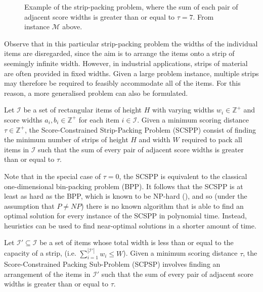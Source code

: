 \documentclass[oribibl]{llncs}
\begin{document}
\begin{figure}	
	\centering
	\begin{subfigure}[h]{0.44\textwidth}
		
		\label{fig:items} \vspace{5pt}
	\end{subfigure} 
	\begin{subfigure}[h]{0.7\textwidth}
		
		\label{fig:itemsaligned}
	\end{subfigure}
	\caption{Example of the strip-packing problem, where the sum of each pair of adjacent score widths is greater than or equal to $\tau = 7$. From instance $\mathcal{M}$ above.}
	\label{fig:items/aligned}
\end{figure}

Observe that in this particular strip-packing problem the widths of the individual items are disregarded, since the aim is to arrange the items onto a strip of seemingly infinite width. However, in industrial applications, strips of material are often provided in fixed widths. Given a large problem instance, multiple strips may therefore be required to feasibly accommodate all of the items. For this reason, a more generalised problem can also be formulated.

\begin{definition}
	Let $\mathcal{I}$ be a set of rectangular items of height $H$ with varying widths $w_i \in \mathbb{Z}^+$ and score widths $a_i, b_i \in \mathbb{Z}^+$ for each item $i \in \mathcal{I}$. Given a minimum scoring distance $\tau \in \mathbb{Z}^+$, the Score-Constrained Strip-Packing Problem (SCSPP) consist of finding the minimum number of strips of height $H$ and width $W$ required to pack all items in $\mathcal{I}$ such that the sum of every pair of adjacent score widths is greater than or equal to $\tau$. %
\end{definition}

Note that in the special case of $\tau = 0$, the SCSPP is equivalent to the classical one-dimensional bin-packing problem (BPP). It follows that the SCSPP is at least as hard as the BPP, which is known to be NP-hard (\citealp{garey1979}), and so (under the assumption that $P \neq NP$) there is no known algorithm that is able to find an optimal solution for every instance of the SCSPP in polynomial time. Instead, heuristics can be used to find near-optimal solutions in a shorter amount of time.

\begin{definition}
	\label{defn:subprob}
	Let $\mathcal{I}' \subseteq \mathcal{I}$ be a set of items whose total width is less than or equal to the capacity of a strip, (i.e. $\sum_{i=1}^{|\mathcal{I}'|}w_i \leq W$). Given a minimum scoring distance $\tau$, the Score-Constrained Packing Sub-Problem (SCPSP) involves finding an arrangement of the items in $\mathcal{I}'$ such that the sum of every pair of adjacent score widths is greater than or equal to $\tau$.
\end{definition}
\end{document}
